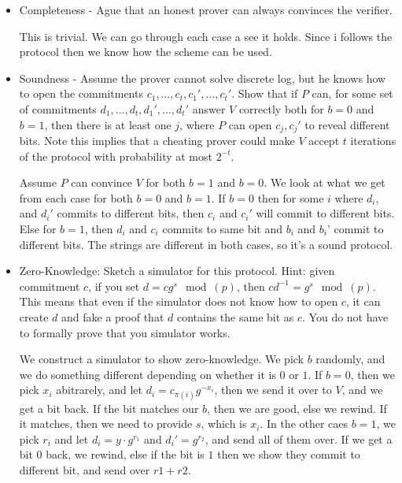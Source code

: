 \documentclass[paper=a4, fontsize=11pt]{scrartcl} %
\numberwithin{equation}{section} %
\numberwithin{figure}{section} %
\numberwithin{table}{section} %
\begin{document}
	\begin{itemize}
		\item Completeness - Ague that an honest prover can always convinces the verifier.
		
		This is trivial. We can go through each case a see it holds. Since i follows the protocol then we know how the scheme can be used. 
		
		\item Soundness - Assume the prover cannot solve discrete log, but he knows how to open the
		commitments $c_1,\dots,c_t,c_1', \dots, c_t'$. Show that if $P$ can, for some set of commitments $d_1, \dots, d_t,d_1',\dots,d_t'$ answer $V$ correctly both for $b = 0$ and $b = 1$, then there is at least one $j$, where $P$ can open $c_j,c_j'$ to reveal different bits. Note this implies that a cheating prover could make $V$ accept $t$ iterations of the protocol with probability at most $2^{-t}$.
		
		Assume $P$ can convince $V$ for both $b=1$ and $b=0$. We look at what we get from each case for both $b=0$ and $b=1$. If $b=0$ then for some $i$ where $d_i$, and $d_i'$ commits to different bits, then $c_i$ and $c_i'$ will commit to different bits. Else for $b=1$, then $d_i$ and $c_i$ commits to same bit and $b_i$ and $b_i$' commit to different bits. The strings are different in both cases, so it's a sound protocol.
		
		\item Zero-Knowledge: Sketch a simulator for this protocol. Hint: given commitment $c$, if you set $d=cg^s\mod(p)$, then $cd^{-1}=g^s\mod(p)$. This means that even if the simulator does not know how to open $c$, it can create $d$ and fake a proof that $d$ contains the same bit as $c$. You do not have to formally prove that you simulator works. 
		
		We construct a simulator to show zero-knowledge. We pick $b$ randomly, and we do something different depending on whether it is $0$ or $1$. If $b=0$, then we pick $x_i$ abitrarely, and let $d_i=c_{\pi(i)}g^{-x_i}$, then we send it over to $V$, and we get a bit back. If the bit matches our $b$, then we are good, else we rewind. If it matches, then we need to provide $s$, which is $x_i$. In the other caes $b=1$, we pick $r_i$ and let $d_i=y\cdot g^{r_1}$ and $d_i'=g^{r_2}$, and send all of them over. If we get a bit $0$ back, we rewind, else if the bit is $1$ then we show they commit to different bit, and send over $r1+r2$.
	
	\end{itemize}
    
\end{document}
